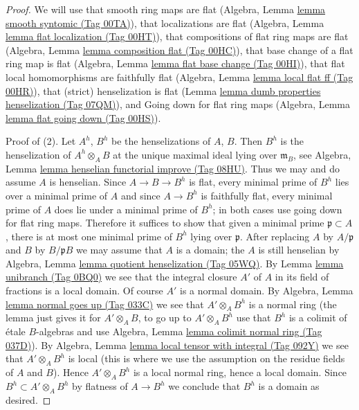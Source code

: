 \documentclass{amsart}
\theoremstyle{plain}
\theoremstyle{definition}
\theoremstyle{remark}
\numberwithin{equation}{subsection}
\begin{document}
\begin{proof}
We will use that smooth ring maps are flat
(Algebra, Lemma \href{https://stacks.math.columbia.edu/tag/00TA}{lemma smooth syntomic (Tag 00TA)}),
that localizations are flat (Algebra, Lemma
\href{https://stacks.math.columbia.edu/tag/00HT}{lemma flat localization (Tag 00HT)}),
that compositions of flat ring maps are flat
(Algebra, Lemma \href{https://stacks.math.columbia.edu/tag/00HC}{lemma composition flat (Tag 00HC)}),
that base change of a flat ring map is flat
(Algebra, Lemma \href{https://stacks.math.columbia.edu/tag/00HI}{lemma flat base change (Tag 00HI)}),
that flat local homomorphisms are faithfully flat
(Algebra, Lemma \href{https://stacks.math.columbia.edu/tag/00HR}{lemma local flat ff (Tag 00HR)}),
that (strict) henselization is flat
(Lemma \href{https://stacks.math.columbia.edu/tag/07QM}{lemma dumb properties henselization (Tag 07QM)}), and
Going down for flat ring maps
(Algebra, Lemma \href{https://stacks.math.columbia.edu/tag/00HS}{lemma flat going down (Tag 00HS)}).

\medskip\noindent
Proof of (2). Let $A^h$, $B^h$ be the henselizations of $A$, $B$. Then $B^h$
is the henselization of $A^h \otimes_A B$ at the unique
maximal ideal lying over $\mathfrak m_B$, see
Algebra, Lemma \href{https://stacks.math.columbia.edu/tag/08HU}{lemma henselian functorial improve (Tag 08HU)}.
Thus we may and do assume $A$ is henselian.
Since $A \to B \to B^h$ is flat, every minimal prime of $B^h$
lies over a minimal prime of $A$ and since $A \to B^h$ is faithfully flat,
every minimal prime of $A$ does lie under a minimal prime of $B^h$;
in both cases use going down for flat ring maps.
Therefore it suffices to show that given a minimal prime
$\mathfrak p \subset A$, there is at most one minimal prime
of $B^h$ lying over $\mathfrak p$.
After replacing $A$ by $A/\mathfrak p$ and $B$ by $B/\mathfrak p B$
we may assume that $A$ is a domain; the $A$ is still henselian by
Algebra, Lemma \href{https://stacks.math.columbia.edu/tag/05WQ}{lemma quotient henselization (Tag 05WQ)}.
By Lemma \href{https://stacks.math.columbia.edu/tag/0BQ0}{lemma unibranch (Tag 0BQ0)} we see that the integral closure
$A'$ of $A$ in its field of fractions is a local domain.
Of course $A'$ is a normal domain. By
Algebra, Lemma \href{https://stacks.math.columbia.edu/tag/033C}{lemma normal goes up (Tag 033C)}
we see that $A' \otimes_A B^h$ is a normal ring
(the lemma just gives it for $A' \otimes_A B$, to go up to
$A' \otimes_A B^h$ use that $B^h$ is a colimit of \'etale
$B$-algebras and use Algebra, Lemma \href{https://stacks.math.columbia.edu/tag/037D}{lemma colimit normal ring (Tag 037D)}).
By Algebra, Lemma \href{https://stacks.math.columbia.edu/tag/092Y}{lemma local tensor with integral (Tag 092Y)}
we see that $A' \otimes_A B^h$ is local (this is where we
use the assumption on the residue fields of $A$ and $B$).
Hence $A' \otimes_A B^h$ is a local normal ring, hence a local domain.
Since $B^h \subset A' \otimes_A B^h$ by flatness of $A \to B^h$
we conclude that $B^h$ is a domain as desired.


\end{proof}
\end{document}
